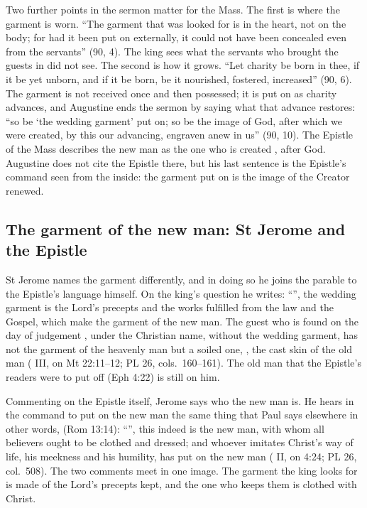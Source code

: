 Two further points in the sermon matter for the Mass. The first is where the
garment is worn. ``The garment that was looked for is in the heart, not on the
body; for had it been put on externally, it could not have been concealed even
from the servants'' (90, 4). The king sees what the servants who brought the
guests in did not see. The second is how it grows. ``Let charity be born in
thee, if it be yet unborn, and if it be born, be it nourished, fostered,
increased'' (90, 6). The garment is not received once and then possessed; it
is put on as charity advances, and Augustine ends the sermon by saying what
that advance restores: ``so be `the wedding garment' put on; so be the image
of God, after which we were created, by this our advancing, engraven anew in
us'' (90, 10). The Epistle of the Mass describes the new man as the one who is
created , after God. Augustine does not cite the Epistle
there, but his last sentence is the Epistle's command seen from the inside:
the garment put on is the image of the Creator renewed.

\subsection{The garment of the new man: St Jerome and the Epistle}

St Jerome names the garment differently, and in doing so he joins the parable
to the Epistle's language himself. On the king's question he writes:
``'', the
wedding garment is the Lord's precepts and the works fulfilled from the law and
the Gospel, which make the garment of the new man. The guest who is found on
the day of judgement , under the Christian name,
without the wedding garment, has not the garment of the heavenly man but a
soiled one, , the cast skin of the old
man ( III, on Mt 22:11--12; PL 26,
cols.~160--161). The old man that the Epistle's readers were to put off
(Eph 4:22) is still on him.

Commenting on the Epistle itself, Jerome says who the new man is. He hears in
the command to put on the new man the same thing that Paul says elsewhere in
other words,  (Rom 13:14): ``'', this indeed is the new man, with whom all believers
ought to be clothed and dressed; and whoever imitates Christ's way of life, his
meekness and his humility, has put on the new man ( II, on 4:24; PL 26, col.~508). The two comments meet in
one image. The garment the king looks for is made of the Lord's precepts kept,
and the one who keeps them is clothed with Christ.

